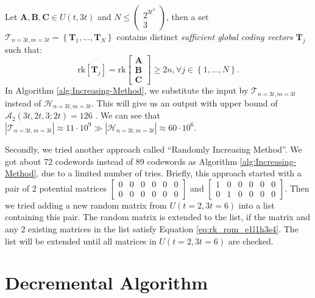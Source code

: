 \begin{defn}
 Let $\boldsymbol{A},\boldsymbol{B},\boldsymbol{C}\in U(t,3t)$ and
$N\leq\left(\begin{array}{c}
2^{3t^{2}}\\
3
\end{array}\right)$, then a set $\mathcal{T}_{n=3t,m=3t}=\left\{ \boldsymbol{T}_{1},\ldots,\boldsymbol{T}_{N}\right\} $
contains distinct \textit{sufficient global coding vectors} $\boldsymbol{T}_{j}$
such that:
\[
\mathrm{rk}\left[\boldsymbol{T}_{j}\right]=\mathrm{rk}\left[\begin{array}{c}
\boldsymbol{A}\\
\boldsymbol{B}\\
\boldsymbol{C}
\end{array}\right]\geq2n,\forall j\in\left\{ 1,\ldots,N\right\} .
\]
In Algorithm \ref{alg:Increasing-Method}, we substitute the input
by $\mathcal{T}_{n=3t,m=3t}$ instead of $\mathcal{H}_{n=3t,m=3t}$.
This will give us an output with upper bound of $\mathcal{A}_{2}\left(3t,2t,3;2t\right)=126$
\cite[Sec. V-B]{Zhang:2019}. We can see that $\left|\mathcal{T}_{n=3t,m=3t}\right|\approx11\cdot10^{9}\gg\left|\mathcal{H}_{n=3t,m=3t}\right|\approx60\cdot10^{6}$.
\end{defn}
Secondly, we tried another approach called ``Randomly Increasing
Method''. We got about 72 codewords instead of 89 codewords as Algorithm
\ref{alg:Increasing-Method}, due to a limited number of tries. Briefly,
this approach started with a pair of 2 potential matrices $\left[\begin{array}{cccccc}
0 & 0 & 0 & 0 & 0 & 0\\
0 & 0 & 0 & 0 & 0 & 0
\end{array}\right]$ and $\left[\begin{array}{cccccc}
1 & 0 & 0 & 0 & 0 & 0\\
0 & 1 & 0 & 0 & 0 & 0
\end{array}\right]$. Then we tried adding a new random matrix from $U\left(t=2,3t=6\right)$
into a list containing this pair. The random matrix is extended to
the list, if the matrix and any 2 existing matrices in the list satisfy
Equation \ref{eq:rk_rqm_e1l1h3s4}. The list will be extended until
all matrices in $U\left(t=2,3t=6\right)$ are checked.

\section{Decremental Algorithm \label{sec:Alternative-Approaches}}

